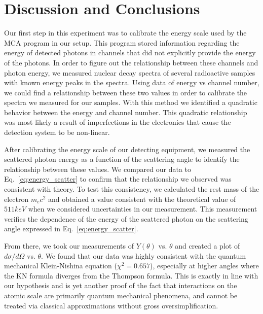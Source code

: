 \documentclass[%
 reprint,
 amsmath,amssymb,
 aps,
 pra,
]{revtex4-1}
\begin{document}
\section{Discussion and Conclusions}

Our first step in this experiment was to calibrate the energy scale used by the MCA program in our setup. This program stored information regarding the energy of detected photons in channels that did not explicitly provide the energy of the photons. In order to figure out the relationship between these channels and photon energy, we measured nuclear decay spectra of several radioactive samples with known energy peaks in the spectra. Using data of energy vs channel number, we could find a relationship between these two values in order to calibrate the spectra we measured for our samples. With this method we identified a quadratic behavior between the energy and channel number. This quadratic relationship was most likely a result of imperfections in the electronics that cause the detection system to be non-linear.

After calibrating the energy scale of our detecting equipment, we measured the scattered photon energy as a function of the scattering angle to identify the relationship between these values. We compared our data to Eq.~\ref{eq:energy_scatter} to confirm that the relationship we observed was consistent with theory. To test this consistency, we calculated the rest mass of the electron $m_{e}c^{2}$ and obtained a value consistent with the theoretical value of $511 keV$ when we considered uncertainties in our measurement. This measurement verifies the dependence of the energy of the scattered photon on the scattering angle expressed in Eq.~\ref{eq:energy_scatter}.

From there, we took our measurements of $Y(\theta)$ vs. $\theta$ and created a plot of $d\sigma / d\Omega$ vs. $\theta$. We found that our data was highly consistent with the quantum mechanical Klein-Nishina equation ($\chi^2 = 0.657$), especially at higher angles where the KN formula diverges from the Thompson formula. This is exactly in line with our hypothesis and is yet another proof of the fact that interactions on the atomic scale are primarily quantum mechanical phenomena, and cannot be treated via classical approximations without gross oversimplification.
\end{document}
